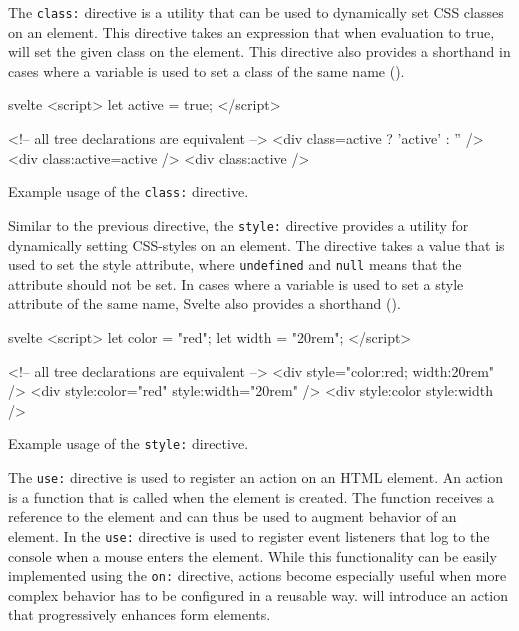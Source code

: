 The \texttt{class:} directive is a utility that can be used to dynamically set CSS classes on an element. This directive takes an expression that when evaluation to true, will set the given class on the element. This directive also provides a shorthand in cases where a variable is used to set a class of the same name ().
\begin{listing}[H]
\begin{myminted}{svelte}{}
<script>
  let active = true;
</script>

<!-- all tree declarations are equivalent -->
<div class={active ? 'active' : ''} />
<div class:active={active} />
<div class:active />
\end{myminted}
\caption{Example usage of the \texttt{class:} directive.}
\label{fig:svelte-class-directive}
\end{listing}

Similar to the previous directive, the \texttt{style:} directive provides a utility for dynamically setting CSS-styles on an element. The directive takes a value that is used to set the style attribute, where \texttt{undefined} and \texttt{null} means that the attribute should not be set. In cases where a variable is used to set a style attribute of the same name, Svelte also provides a shorthand ().

\begin{listing}[H]
\begin{myminted}{svelte}{}
<script>
  let color = "red";
  let width = "20rem";
</script>

<!-- all tree declarations are equivalent -->
<div style="color:red; width:20rem" />
<div style:color="red" style:width="20rem" />
<div style:color style:width />
\end{myminted}
\caption{Example usage of the \texttt{style:} directive.}
\label{fig:svelte-style-directive}
\end{listing}

The \texttt{use:} directive is used to register an action on an HTML element. An action is a function that is called when the element is created. The function receives a reference to the element and can thus be used to augment behavior of an element. In  the \texttt{use:} directive is used to register event listeners that log to the console when a mouse enters the element. While this functionality can be easily implemented using the \texttt{on:} directive, actions become especially useful when more complex behavior has to be configured in a reusable way.  will introduce an action that progressively enhances form elements.

